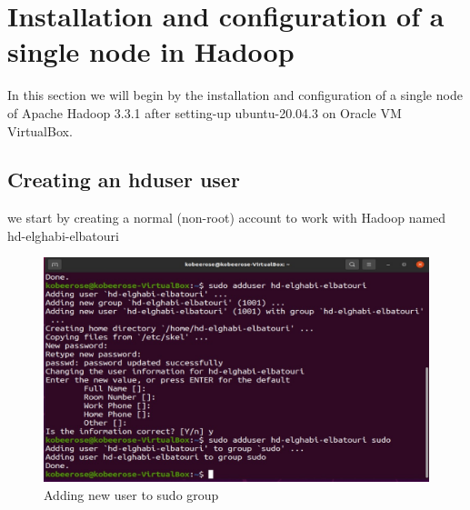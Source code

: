 \chapter{Installation and configuration of a single node in Hadoop}
\par In this section we will begin by the installation and configuration of a single node of Apache Hadoop 3.3.1 after setting-up ubuntu-20.04.3 on Oracle VM VirtualBox.
\begin{spacing}{1.2}
\section{Creating an hduser user }

\par we start by creating a normal (non-root) account to work with Hadoop named hd-elghabi-elbatouri
\\
\begin{figure}[!htb] 
\begin{center} 
\includegraphics[width=1\linewidth]{Big_Data/Hadoop/Apache Hadoop Installation/Adding new user to sudo group}
\end{center} 
\caption{Adding new user to sudo group} 
\end{figure} 
\FloatBarrier




\end{spacing}
